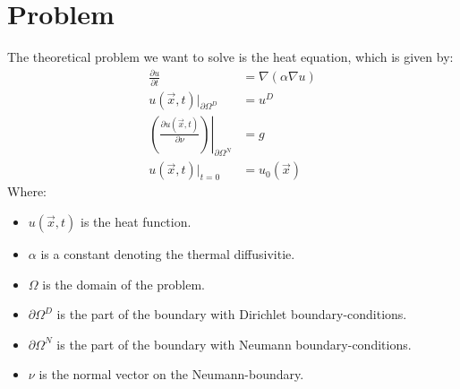 
\section{\label{sec::problem}Problem}
The theoretical problem we want to solve is the heat equation, which is given by:
\begin{align}
	\frac{\partial u}{\partial t} &= \nabla(\alpha\nabla u) \label{eqn::strongForm}\\
	u(\vec{x},t)|_{\partial\Omega^D} &= u^D\\
	\left.\left( \frac{\partial u(\vec{x},t)}{\partial \nu}\right)\right|_{\partial\Omega^N} &= g\\
	u(\vec{x},t)|_{t=0} &=u_0(\vec{x})
\end{align}
Where:
\begin{itemize}
	\item $u(\vec{x},t)$ is the heat function.
	\item $\alpha$ is a constant denoting the thermal diffusivitie.
	\item $\Omega$ is the domain of the problem.
	\item $\partial\Omega^D$ is the part of the boundary with Dirichlet boundary-conditions.
	\item $\partial\Omega^N$ is the part of the boundary with Neumann boundary-conditions.
	\item $\nu$ is the normal vector on the Neumann-boundary.
\end{itemize} 